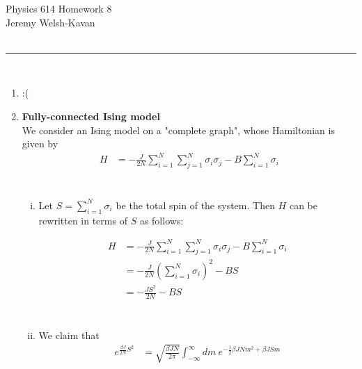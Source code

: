 \documentclass[]{article}
\begin{document}
{\Large Physics 614 Homework 8}\\
{Jeremy Welsh-Kavan}\\
\hfill \\
\noindent\rule{15cm}{0.4pt} \\

\begin{enumerate}[1.]

\item :(

\item {\bf Fully-connected Ising model} \\

We consider an Ising model on a "complete graph", whose Hamiltonian is given by \\

\begin{equation}
\begin{aligned}
H & = - \frac{ J }{ 2 N} \sum_{i = 1}^{N} \sum_{ j =1 }^{ N} \sigma_i \sigma_j - B \sum_{ i = 1}^{N} \sigma_i \\
\end{aligned}
\end{equation} \\

\begin{enumerate}[i.]

\item Let $S = \sum_{ i = 1}^{N} \sigma_i $ be the total spin of the system. Then $H$ can be rewritten in terms of $S$ as follows:

\begin{equation}
\begin{aligned}
H & = - \frac{ J }{ 2 N} \sum_{i = 1}^{N} \sum_{ j =1 }^{ N} \sigma_i \sigma_j - B \sum_{ i = 1}^{N} \sigma_i \\
& = - \frac{ J }{ 2 N} \left( \sum_{i = 1}^{N}  \sigma_i \right)^2 - B S \\
& = - \frac{ J S^2 }{ 2 N}  - B S \\
\end{aligned}
\end{equation} \\

\item We claim that \\

\begin{equation}
\begin{aligned}
e^{ \frac{ \beta J }{ 2N } S^2} & = \sqrt{  \frac{ \beta J N }{ 2 \pi }   } \int_{-\infty}^{\infty} dm \: e^{ -  \frac{1}{2} \beta J N m^2 + \beta J S m} \\
\end{aligned}
\end{equation} \\


\end{enumerate}
\end{enumerate}
\end{document}
